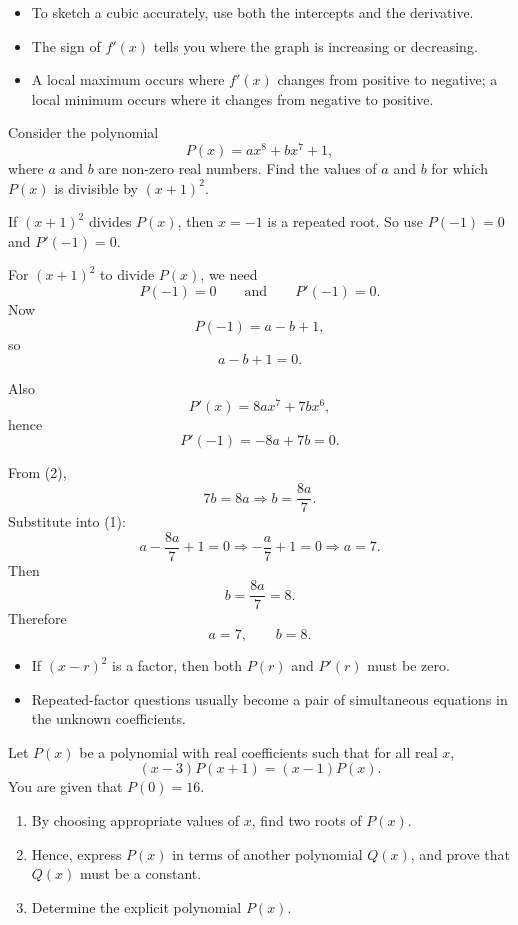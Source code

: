 \begin{takeaways}
\begin{itemize}[leftmargin=*]
\item To sketch a cubic accurately, use both the intercepts and the derivative.
\item The sign of $f'(x)$ tells you where the graph is increasing or decreasing.
\item A local maximum occurs where $f'(x)$ changes from positive to negative; a local minimum occurs where it changes from negative to positive.
\end{itemize}
\end{takeaways}

\begin{problem}[Divisibility by $(x+1)^2$]
Consider the polynomial
\[
P(x)=ax^8+bx^7+1,
\]
where $a$ and $b$ are non-zero real numbers. Find the values of $a$ and $b$ for which $P(x)$ is divisible by $(x+1)^2$.
\end{problem}

\begin{hintbox}
If $(x+1)^2$ divides $P(x)$, then $x=-1$ is a repeated root. So use $P(-1)=0$ and $P'(-1)=0$.
\end{hintbox}

\begin{solution}
For $(x+1)^2$ to divide $P(x)$, we need
\[
P(-1)=0\qquad\text{and}\qquad P'(-1)=0.
\]
Now
\[
P(-1)=a-b+1,
\]
so
\[
a-b+1=0. \tag{1}
\]

Also
\[
P'(x)=8ax^7+7bx^6,
\]
hence
\[
P'(-1)=-8a+7b=0. \tag{2}
\]

From (2),
\[
7b=8a \Rightarrow b=\frac{8a}{7}.
\]
Substitute into (1):
\[
a-\frac{8a}{7}+1=0
\Rightarrow -\frac{a}{7}+1=0
\Rightarrow a=7.
\]
Then
\[
b=\frac{8a}{7}=8.
\]
Therefore
\[
\boxed{a=7,\qquad b=8.}
\]
\end{solution}

\begin{takeaways}
\begin{itemize}[leftmargin=*]
\item If $(x-r)^2$ is a factor, then both $P(r)$ and $P'(r)$ must be zero.
\item Repeated-factor questions usually become a pair of simultaneous equations in the unknown coefficients.
\end{itemize}
\end{takeaways}

\begin{problem}
Let $P(x)$ be a polynomial with real coefficients such that for all real $x$,
\[
(x-3)P(x+1)=(x-1)P(x).
\]
You are given that $P(0)=16$.
\begin{enumerate}[label=(\roman*)]
\item By choosing appropriate values of $x$, find two roots of $P(x)$.
\item Hence, express $P(x)$ in terms of another polynomial $Q(x)$, and prove that $Q(x)$ must be a constant.
\item Determine the explicit polynomial $P(x)$.
\end{enumerate}
\end{problem}

